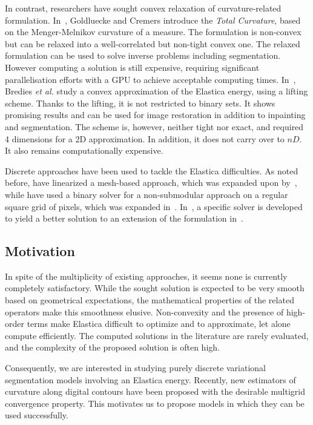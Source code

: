 \documentclass[smallextended]{svjour3}       %
\begin{document}
In contrast, researchers have sought convex relaxation of curvature-related
formulation. In~\cite{goldluecke11totalcurvature}, Goldluecke and Cremers introduce the {\em Total Curvature}, based
on the Menger-Melnikov curvature of a measure. The formulation is non-convex but can be relaxed into a well-correlated
but non-tight convex one. The relaxed formulation can be used to solve inverse problems including segmentation. However computing a solution is still expensive, requiring significant parallelisation efforts with a GPU to achieve
  acceptable computing times. In~\cite{bredies15convex}, Bredies {\em et al.} study a convex approximation of the
  Elastica energy, using a lifting scheme. Thanks to the lifting, it is not restricted to binary sets. It shows
  promising results and can be used for image restoration in addition to inpainting and segmentation. The scheme is,
  however, neither tight nor exact, and required 4 dimensions for a 2D approximation. In addition, it does not carry over
to $nD$. It also remains computationally expensive.


Discrete approaches have been used to tackle the Elastica
difficulties. As noted before, \cite{schoenemann09linear} have
linearized a mesh-based approach, which was expanded upon
by~\cite{strandmark11globalframework}, while \cite{zehiry10fast} have
used a binary solver for a non-submodular approach on a regular square
grid of pixels, which was expanded
in~\cite{el2016contrast}. In~\cite{nieuwenhuis14efficient}, a
specific solver is developed to yield a better solution to an
extension of the formulation in~\cite{zehiry10fast}.


\subsection{Motivation}
In spite of the multiplicity of existing approaches, it seems none is
currently completely satisfactory. While the sought solution is
expected to be very smooth based on geometrical expectations, the
mathematical properties of the related operators make this smoothness
elusive. Non-convexity and the presence of high-order terms make
Elastica difficult to optimize and to approximate, let alone compute
efficiently. The computed solutions in the literature are rarely
evaluated, and the complexity of the proposed solution is often high.


Consequently, we are interested in studying purely discrete
variational segmentation models involving an Elastica
energy. Recently, new estimators of curvature along digital contours
have been proposed
\cite{roussillon11mdca,coeurjolly13integral,schindele17mdca} with the
desirable multigrid convergence property. This motivates us to propose
models in which they can be used successfully.
\end{document}
